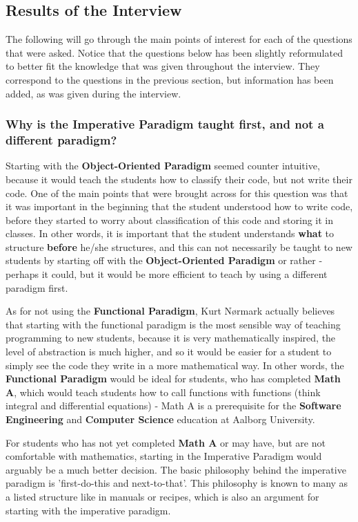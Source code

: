 \subsection{Results of the Interview}

The following will go through the main points of interest for each of the questions that were asked. Notice that the questions below has been slightly 
reformulated to better fit the knowledge that was given throughout the interview. They correspond to the questions in the previous section, but 
information has been added, as was given during the interview.

\subsubsection{Why is the Imperative Paradigm taught first, and not a different paradigm?}

Starting with the \textbf{Object-Oriented Paradigm} seemed counter intuitive, because it would teach the students how to classify their code, but not 
write their code. One of the main points that were brought across for this question was that it was important in the beginning that the student 
understood how to write code, before they started to worry about classification of this code and storing it in classes. In other words, it is important 
that the student understands \textbf{what} to structure \textbf{before} he/she structures, and this can not necessarily be taught to new students by 
starting off with the \textbf{Object-Oriented Paradigm} or rather - perhaps it could, but it would be more efficient to teach by using a different 
paradigm first. 


As for not using the \textbf{Functional Paradigm}, Kurt N{\o}rmark actually believes that starting with the functional paradigm is the most sensible 
way of teaching programming to new students, because it is very mathematically inspired, the level of abstraction is much higher, and so it would be 
easier for a student to simply see the code they write in a more mathematical way. In other words, the \textbf{Functional Paradigm} would be ideal for 
students, who has completed \textbf{Math A}, which would teach students how to call functions with functions (think integral and differential equations)
 - Math A is a prerequisite for the \textbf{Software Engineering} and \textbf{Computer Science} education at Aalborg University.


For students who has not yet completed \textbf{Math A} or may have, but are not comfortable with mathematics, starting in the Imperative Paradigm would 
arguably be a much better decision. The basic philosophy behind the imperative paradigm is 'first-do-this and next-to-that'. This philosophy is known 
to many as a listed structure like in manuals or recipes, which is also an argument for starting with the imperative paradigm.


